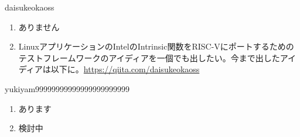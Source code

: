 \begin{prework}{ daisukeokaoss }
  \begin{enumerate}
  \item ありません
  \item LinuxアプリケーションのIntelのIntrinsic関数をRISC-Vにポートするためのテストフレームワークのアイディアを一個でも出したい。今まで出したアイディアは以下に。\url{https://qiita.com/daisukeokaoss}
  \end{enumerate}
\end{prework}

\begin{prework}{ yukiyam99999999999999999999999 }
  \begin{enumerate}
  \item あります
  \item 検討中
  \end{enumerate}
\end{prework}
